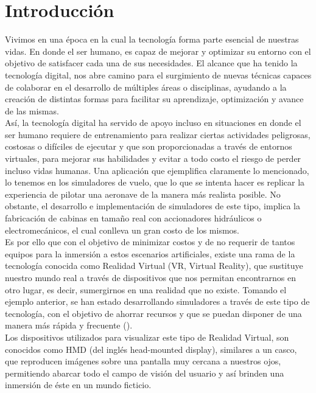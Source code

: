 \documentclass[a4paper,openright,12pt]{report}
\begin{document}
\cleardoublepage
\chapter{Introducción}\label{cap.introduccion}
\pagestyle{fancy}
Vivimos en una época en la cual la tecnología forma parte esencial de nuestras vidas. En donde el ser humano, es capaz de mejorar y optimizar su entorno con el objetivo de satisfacer cada una de sus necesidades. El alcance que ha tenido la tecnología digital, nos abre camino para el surgimiento de nuevas técnicas capaces de colaborar en el desarrollo de múltiples áreas o disciplinas, ayudando a la creación de distintas formas para facilitar su aprendizaje, optimización y avance de las mismas.\\
Así, la tecnología digital ha servido de apoyo incluso en situaciones en donde el ser humano requiere de entrenamiento para realizar ciertas actividades peligrosas, costosas o difíciles de ejecutar y que son proporcionadas a través de entornos virtuales, para mejorar sus habilidades y evitar a todo costo el riesgo de perder incluso vidas humanas. Una aplicación que ejemplifica claramente lo mencionado, lo tenemos en los simuladores de vuelo, que lo que se intenta hacer es replicar la experiencia de pilotar una aeronave de la manera más realista posible. No obstante, el desarrollo e implementación de simuladores de este tipo, implica la fabricación de cabinas en tamaño real con accionadores hidráulicos o electromecánicos, el cual conlleva un gran costo de los mismos.\\
Es por ello que con el objetivo de minimizar costos y de no requerir de tantos equipos para la inmersión a estos escenarios artificiales, existe una rama de la tecnología conocida como Realidad Virtual (VR, Virtual Reality), que sustituye nuestro mundo real a través de dispositivos que nos permitan encontrarnos en otro lugar, es decir, sumergirnos en una realidad que no existe. Tomando el ejemplo anterior, se han estado desarrollando simuladores a través de este tipo de tecnología, con el objetivo de ahorrar recursos y que se puedan disponer de una manera más rápida y frecuente (\cite{Pausch1992,allerton2010}).\\
Los dispositivos utilizados para visualizar este tipo de Realidad Virtual, son conocidos como HMD (del inglés head-mounted display), similares a un casco, que reproducen imágenes sobre una pantalla muy cercana a nuestros ojos, permitiendo abarcar todo el campo de visión del usuario y así brinden una inmersión de éste en un mundo ficticio.\\
\end{document}

